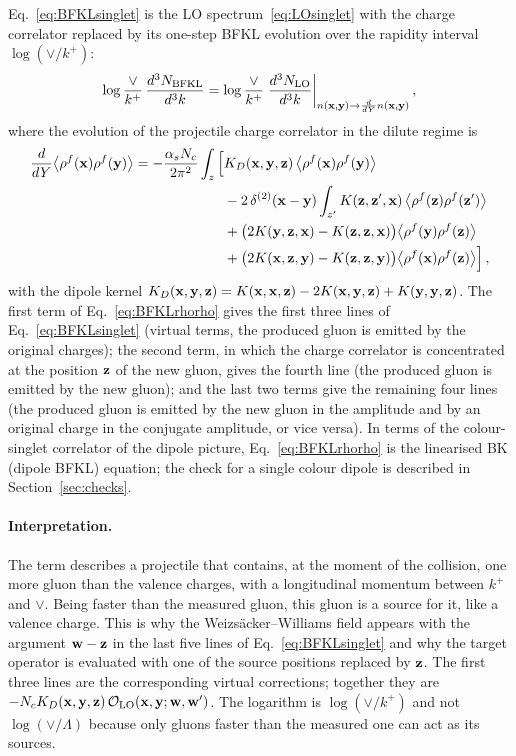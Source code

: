 Eq.~\eqref{eq:BFKLsinglet} is the LO spectrum~\eqref{eq:LOsinglet} with the charge correlator replaced by its one-step BFKL evolution over the rapidity interval $\log(\vee/k^+)$:
\begin{align}\label{eq:BFKLasLO}
\log\frac{\vee}{k^+}\,\frac{d^3N_{\rm BFKL}}{d^3k}=\log\frac{\vee}{k^+}\;\frac{d^3N_{\rm LO}}{d^3k}\bigg|_{n(\mathbf{x},\mathbf{y})\to\frac{d}{dY}n(\mathbf{x},\mathbf{y})}\,,
\end{align}
where the evolution of the projectile charge correlator in the dilute regime is~\cite{Kovner:2006wr,Kovner:2006ge}
\begin{align}\label{eq:BFKLrhorho}
\frac{d}{dY}\big\langle\rho^f(\mathbf{x})\rho^f(\mathbf{y})\big\rangle=-\frac{\alpha_sN_c}{2\pi^2}\int_z\Big[&K_D(\mathbf{x},\mathbf{y},\mathbf{z})\,\big\langle\rho^f(\mathbf{x})\rho^f(\mathbf{y})\big\rangle
\notag\\&-2\,\delta^{(2)}(\mathbf{x}-\mathbf{y})\int_{z'}K(\mathbf{z},\mathbf{z}',\mathbf{x})\,\big\langle\rho^f(\mathbf{z})\rho^f(\mathbf{z}')\big\rangle
\notag\\&
+\big(2K(\mathbf{y},\mathbf{z},\mathbf{x})-K(\mathbf{z},\mathbf{z},\mathbf{x})\big)\big\langle\rho^f(\mathbf{y})\rho^f(\mathbf{z})\big\rangle
\notag\\&+\big(2K(\mathbf{x},\mathbf{z},\mathbf{y})-K(\mathbf{z},\mathbf{z},\mathbf{y})\big)\big\langle\rho^f(\mathbf{x})\rho^f(\mathbf{z})\big\rangle\Big]\,,
\end{align}
with the dipole kernel $K_D(\mathbf{x},\mathbf{y},\mathbf{z})=K(\mathbf{x},\mathbf{x},\mathbf{z})-2K(\mathbf{x},\mathbf{y},\mathbf{z})+K(\mathbf{y},\mathbf{y},\mathbf{z})$. The first term of Eq.~\eqref{eq:BFKLrhorho} gives the first three lines of Eq.~\eqref{eq:BFKLsinglet} (virtual terms, the produced gluon is emitted by the original charges); the second term, in which the charge correlator is concentrated at the position $\mathbf{z}$ of the new gluon, gives the fourth line (the produced gluon is emitted by the new gluon); and the last two terms give the remaining four lines (the produced gluon is emitted by the new gluon in the amplitude and by an original charge in the conjugate amplitude, or vice versa). In terms of the colour-singlet correlator of the dipole picture, Eq.~\eqref{eq:BFKLrhorho} is the linearised BK (dipole BFKL) equation; the check for a single colour dipole is described in Section~\ref{sec:checks}.

\paragraph{Interpretation.} The term describes a projectile that contains, at the moment of the collision, one more gluon than the valence charges, with a longitudinal momentum between $k^+$ and $\vee$. Being faster than the measured gluon, this gluon is a source for it, like a valence charge. This is why the Weizs\"acker--Williams field appears with the argument $\mathbf{w}-\mathbf{z}$ in the last five lines of Eq.~\eqref{eq:BFKLsinglet} and why the target operator is evaluated with one of the source positions replaced by $\mathbf{z}$. The first three lines are the corresponding virtual corrections; together they are $-N_cK_D(\mathbf{x},\mathbf{y},\mathbf{z})\,\mathcal O_{\rm LO}(\mathbf{x},\mathbf{y};\mathbf{w},\mathbf{w}')$. The logarithm is $\log(\vee/k^+)$ and not $\log(\vee/\Lambda)$ because only gluons faster than the measured one can act as its sources.

